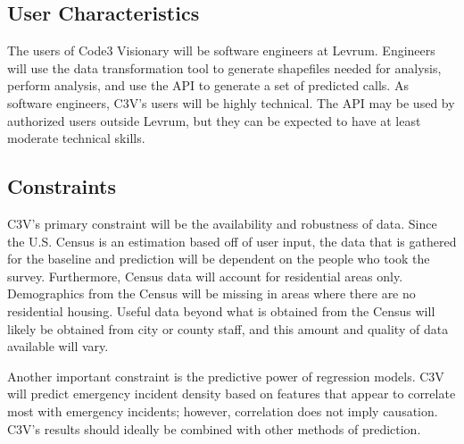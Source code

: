 \documentclass[onecolumn, draftclsnofoot,10pt, compsoc]{IEEEtran}
\begin{document}
    \subsection{User Characteristics}
    The users of Code3 Visionary will be software engineers at Levrum.
    Engineers will use the data transformation tool to generate shapefiles needed for analysis, perform analysis, and use the API to generate a set of predicted calls.
    As software engineers, C3V's users will be highly technical.
    The API may be used by authorized users outside Levrum, but they can be expected to have at least moderate technical skills.
    \subsection{Constraints}
     
    C3V's primary constraint will be the availability and robustness of data. 
    Since the U.S. Census is an estimation based off of user input, the data that is gathered for the baseline and prediction will be dependent on the people who took the survey.
    Furthermore, Census data will account for residential areas only. 
    Demographics from the Census will be missing in areas where there are no residential housing.
    Useful data beyond what is obtained from the Census will likely be obtained from city or county staff, and this amount and quality of data available will vary.
    
    Another important constraint is the predictive power of regression models. C3V will predict emergency incident density based on features that appear to correlate most with emergency incidents; however, correlation does not imply causation. C3V's results should ideally be combined with other methods of prediction.
    
\end{document}
